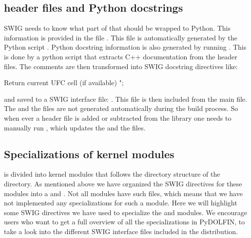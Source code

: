 \subsection{\dolfin header files and Python docstrings}
SWIG needs to know what part of \dolfin that should be wrapped to Python. This information is provided in the file . This file is automatically generated by the Python script . Python docstring information is also generated by running . This is done by a python script that extracts C++ documentation from the header files. The comments are then transformed into SWIG docstring directives like:
\begin{c++}
Return current UFC cell (if available)
";
\end{c++}
and saved to a SWIG interface file: . This file is then included from the main  file. The  and the  files are not generated automatically during the build process. So when ever a header file is added or subtracted from the \dolfin library one needs to manually run , which updates the  and the  files.


\subsection{Specializations of kernel modules}
\dolfin is divided into kernel modules that follows the directory structure of the  directory. As mentioned above we have organized the SWIG directives for these modules into a  and . Not all modules have such files, which means that we have not implemented any specializations for such a module. Here we will highlight some SWIG directives we have used to specialize the  and  modules. We encourage users who want to get a full overview of all the specializations in PyDOLFIN, to take a look into the different SWIG interface files included in the distribution.

